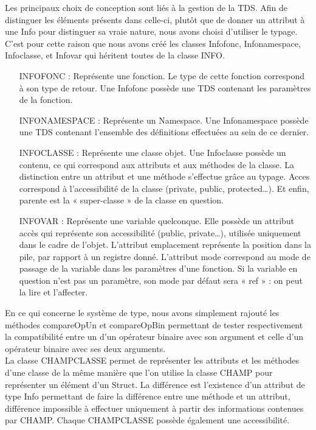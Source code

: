 \documentclass{report}
\begin{document}
Les principaux choix de conception sont liés à la gestion de la TDS. Afin de distinguer les éléments présents dans celle-ci, plutôt que de donner un attribut à une Info pour distinguer sa vraie nature, nous avons choisi d'utiliser le typage. C'est pour cette raison que nous avons créé les classes Infofonc, Infonamespace, Infoclasse, et Infovar qui héritent toutes de la classe INFO. \\

\begin{itemize}
 	\item[INFOFONC :]Représente une fonction. Le type de cette fonction correspond à son type de retour. Une Infofonc possède une TDS contenant les paramètres de la fonction.\\
 	\item[INFONAMESPACE :]Représente un Namespace. Une Infonamespace possède une TDS contenant  l'ensemble des définitions effectuées au sein de ce dernier.\\
 	\item[INFOCLASSE :]Représente une classe objet. Une Infoclasse possède un contenu, ce qui correspond aux attributs et aux méthodes de la classe. La distinction entre un attribut et une méthode s'effectue grâce au typage. Acces correspond à l'accessibilité de la classe (private, public, protected…). Et enfin, parente est la « super-classe » de  la classe en question.\\
 	\item[INFOVAR :]Représente une variable quelconque. Elle possède un attribut accès qui représente son accessibilité (public, private…), utilisée uniquement dans le cadre de l’objet. L’attribut emplacement représente la position dans la pile, par rapport à un registre donné. L’attribut mode correspond au mode de passage de la variable dans les paramètres d’une fonction. Si la variable en question n’est pas un paramètre, son mode par défaut sera « ref » : on peut la lire et l’affecter.\\
\end{itemize}

En ce qui concerne le système de type, nous avons simplement rajouté les méthodes compareOpUn et compareOpBin permettant de tester respectivement la compatibilité entre un d'un opérateur binaire avec son argument et celle d'un opérateur binaire avec ses deux arguments. \\
La classe CHAMPCLASSE permet de représenter les attributs et les méthodes d'une classe de la même manière que l'on utilise la classe CHAMP pour représenter un élément d'un Struct. La différence est l'existence d'un attribut de type Info permettant de faire la différence entre une méthode et un attribut, différence impossible à effectuer uniquement à partir des informations contenues par CHAMP. Chaque CHAMPCLASSE possède également une accessibilité. 
\end{document}
